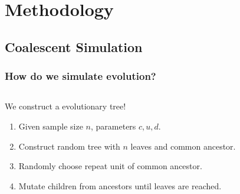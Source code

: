 \documentclass[11pt]{beamer}
\begin{document}
    \section{Methodology}\label{sec:m}
	\subsection{Coalescent Simulation}\label{subsec:c}
    \begin{frame}
        \frametitle{How do we simulate evolution?}
        \begin{columns}
            \begin{column}{0.5\textwidth}
                We construct a evolutionary tree!
                \begin{enumerate}
                    \item Given sample size $n$, parameters $c, u, d$. \medskip
                    \item Construct random tree with $n$ leaves and common ancestor. \medskip
                    \item Randomly choose repeat unit of common ancestor. \medskip
                    \item Mutate children from ancestors until leaves are reached.
                \end{enumerate}
            \end{column}
            \begin{column}{0.5\textwidth}
                \centering{}
            \end{column}
        \end{columns}
    \end{frame}
\end{document}
